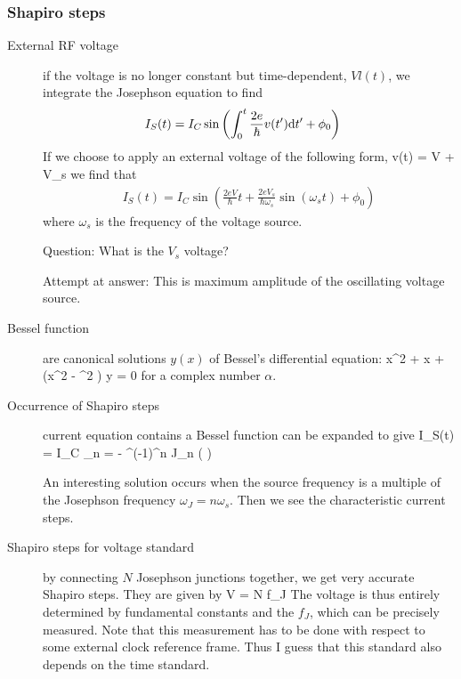 \subsubsection{Shapiro steps}
\begin{description}
\item[External RF voltage] if the voltage is no longer constant but time-dependent, $Vl(t)$, we integrate the Josephson equation to find
\begin{align}
I_S(t) &= I_C \sin{\left( \int^t_0 \frac{2e}{\hbar} v(t') \mathrm{d}t' + \phi_0 \right) } 
\end{align}
If we choose to apply an external voltage of the following form, 
\beq
v(t) = V + V_s
\eeq
we find that
\begin{align}
I_S(t)= I_C \sin{\left( \frac{2eV}{\hbar} t + \frac{2eV_s}{\hbar \omega_s} \sin{\left( \omega_s t\right)} + \phi_0 \right)}
\end{align}
where $\omega_s$ is the frequency of the voltage source. 

Question: What is the $V_s$ voltage?  

Attempt at answer: This is maximum amplitude of the oscillating voltage source. 

\item[Bessel function] are canonical solutions $y(x)$ of Bessel's differential equation:
\beq
x^2  + x  + (x^2 - \alpha^2 ) y = 0
\eeq
for a complex number $\alpha$. 

\item[Occurrence of Shapiro steps] current equation contains a Bessel function can be expanded to give
\beq
I_S(t) = I_C \sum_{n = - \infty}^\infty (-1)^n J_n \left(  \right) 
\eeq

An interesting solution occurs when the source frequency is a multiple of the Josephson frequency $\omega_J = n \omega_s$. Then we see the  characteristic current steps. 

\item[Shapiro steps for voltage standard] by connecting $N$ Josephson junctions together, we get very accurate Shapiro steps. They are given by 
\beq
V  = N  f_J
\eeq
The voltage is thus entirely determined by fundamental constants and the $f_J$, which can be precisely measured. Note that this measurement has to be done with respect to some external clock reference frame. Thus I guess that this standard also depends on the time standard. 

\end{description}


